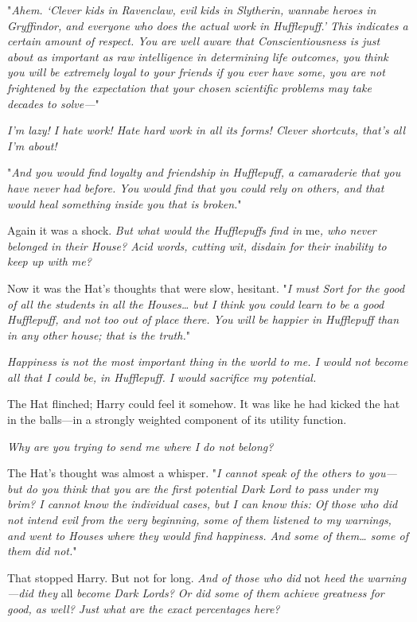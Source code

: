 "\emph{Ahem. `Clever kids in Ravenclaw, evil kids in Slytherin, wannabe heroes
in Gryffindor, and everyone who does the actual work in Hufflepuff.' This
indicates a certain amount of respect. You are well aware that
Conscientiousness is just about as important as raw intelligence in determining
life outcomes, you think you will be extremely loyal to your friends if you
ever have some, you are not frightened by the expectation that your chosen
scientific problems may take decades to solve---}"

\emph{I'm lazy! I hate work! Hate hard work in all its forms! Clever shortcuts,
that's all I'm about!}

"\emph{And you would find loyalty and friendship in Hufflepuff, a camaraderie
that you have never had before. You would find that you could rely on others,
and that would heal something inside you that is broken.}"

Again it was a shock. \emph{But what would the Hufflepuffs find in} me\emph{,
who never belonged in their House? Acid words, cutting wit, disdain for their
inability to keep up with me?}

Now it was the Hat's thoughts that were slow, hesitant. "\emph{I must Sort for
the good of all the students in all the Houses{\ldots} but I think you could
learn to be a good Hufflepuff, and not too out of place there. You will be
happier in Hufflepuff than in any other house; that is the truth.}"

\emph{Happiness is not the most important thing in the world to me. I would not
become all that I could be, in Hufflepuff. I would sacrifice my potential.}

The Hat flinched; Harry could feel it somehow. It was like he had kicked the
hat in the balls---in a strongly weighted component of its utility function.

\emph{Why are you trying to send me where I do not belong?}

The Hat's thought was almost a whisper. "\emph{I cannot speak of the others to
you---but do you think that you are the first potential Dark Lord to pass under
my brim? I cannot know the individual cases, but I can know this: Of those who
did not intend evil from the very beginning, some of them listened to my
warnings, and went to Houses where they would find happiness. And some of
them{\ldots} some of them did not.}"

That stopped Harry. But not for long. \emph{And of those who did} not
\emph{heed the warning---did they} all \emph{become Dark Lords? Or did some of them
achieve greatness for good, as well? Just what are the exact percentages here?}

